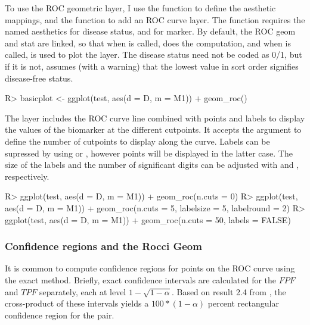 \documentclass[codesnippet]{jss}
\begin{document}
To use the ROC geometric layer, I use the  function to
define the aesthetic mappings, and the  function to add
an ROC curve layer. The  function requires the named
aesthetics  for disease status, and  for marker. By
default, the ROC geom and stat are linked, so that when 
is called,  does the computation, and when
 is called,  is used to plot the layer.
The disease status need not be coded as 0/1, but if it is not,
 assumes (with a warning) that the lowest value in sort
order signifies disease-free status.

\begin{Schunk}
\begin{Sinput}
R> basicplot <- ggplot(test, aes(d = D, m = M1)) + geom_roc()
\end{Sinput}
\end{Schunk}

The  layer includes the ROC curve line combined with
points and labels to display the values of the biomarker at the
different cutpoints. It accepts the argument  to define the
number of cutpoints to display along the curve. Labels can be supressed
by using  or , however points will
be displayed in the latter case. The size of the labels and the number
of significant digits can be adjusted with  and
, respectively.

\begin{Schunk}
\begin{Sinput}
R> ggplot(test, aes(d = D, m = M1)) + geom_roc(n.cuts = 0)
R> ggplot(test, aes(d = D, m = M1)) + geom_roc(n.cuts = 5, labelsize = 5, labelround = 2)
R> ggplot(test, aes(d = D, m = M1)) + geom_roc(n.cuts = 50, labels = FALSE)
\end{Sinput}
\end{Schunk}

\subsubsection{Confidence regions and the Rocci
Geom}\label{confidence-regions-and-the-rocci-geom}

It is common to compute confidence regions for points on the ROC curve
using the \citet{clopper1934use} exact method. Briefly, exact confidence
intervals are calculated for the \(FPF\) and \(TPF\) separately, each at
level \(1 - \sqrt{1 - \alpha}\). Based on result 2.4 from
\citet{pepe2003statistical}, the cross-product of these intervals yields
a \(100 * (1 - \alpha)\) percent rectangular confidence region for the
pair.
\end{document}
